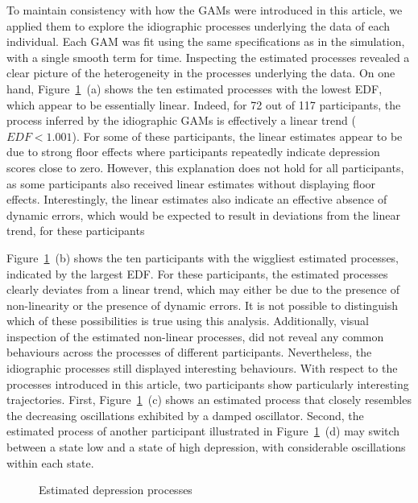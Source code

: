 \documentclass[man, floatsintext]{apa7}
\begin{document}
To maintain consistency with how the GAMs were introduced in this article, we
applied them to explore the idiographic processes underlying the data of each
individual. Each GAM was fit using the same specifications as in the
simulation, with a single smooth term for time. Inspecting the estimated
processes revealed a clear picture of the heterogeneity in the processes
underlying the data. On one hand, Figure~\ref{fig:dem_smooth}~(a) shows the ten
estimated processes with the lowest EDF, which appear to be essentially linear.
Indeed, for 72 out of 117 participants, the process inferred by the idiographic
GAMs is effectively a linear trend ($EDF < 1.001$). For some of these
participants, the linear estimates appear to be due to strong floor effects
where participants repeatedly indicate depression scores close to zero.
However, this explanation does not hold for all participants, as some
participants also received linear estimates without displaying floor effects.
Interestingly, the linear estimates also indicate an effective absence of
dynamic errors, which would be expected to result in deviations from the linear
trend, for these participants

Figure~\ref{fig:dem_smooth}~(b) shows the ten participants with the wiggliest
estimated processes, indicated by the largest EDF\@. For these participants,
the estimated processes clearly deviates from a linear trend, which may either
be due to the presence of non-linearity or the presence of dynamic errors. It
is not possible to distinguish which of these possibilities is true using this
analysis. Additionally, visual inspection of the estimated non-linear
processes, did not reveal any common behaviours across the processes of
different participants. Nevertheless, the idiographic processes still displayed
interesting behaviours. With respect to the processes introduced in this
article, two participants show particularly interesting trajectories. First,
Figure~\ref{fig:dem_smooth}~(c) shows an estimated process that closely
resembles the decreasing oscillations exhibited by a damped oscillator.
Second, the estimated process of another participant illustrated in
Figure~\ref{fig:dem_smooth}~(d) may switch between a state low
and a state of high depression, with considerable oscillations within each
state.

\begin{figure}[!t]
  \caption{Estimated depression processes}
  \label{fig:dem_smooth}
\end{figure}
\end{document}
